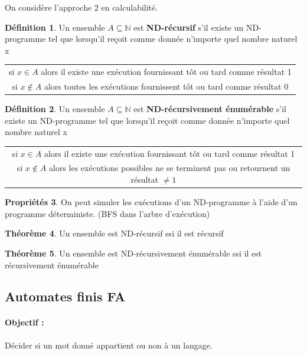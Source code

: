 \documentclass[11pt,a4paper]{article}
\newcommand{\N}{\mathbb{N}}
\theoremstyle{definition}
\newtheorem{mydef}{Définition}
\newtheorem{myprop}[mydef]{Propriétés}
\newtheorem{mytheo}[mydef]{Théorème}
\begin{document}
On considère l'approche 2 en calculabilité.

\begin{mydef}
	Un ensemble $A \subseteq \N$ est \textbf{ND-récursif} s’il existe un 
	ND-programme tel que lorsqu'il reçoit comme donnée n'importe quel nombre 
	naturel x \\
	\begin{tabular}{c}
	si $x \in A$ alors il existe une exécution fournissant tôt ou tard 
	comme résultat 1 \\
	si $x \notin A$ alors toutes les exécutions fournissent tôt ou tard 
	comme résultat 0 \\
	\end{tabular}
\end{mydef}

\begin{mydef}
	Un ensemble $A \subseteq \N$ est \textbf{ND-récursivement énumérable} s’il existe un 
	ND-programme tel que lorsqu'il reçoit comme donnée n'importe quel nombre 
	naturel x
	\begin{tabular}{c}
	si $x \in A$ alors il existe une exécution fournissant tôt ou tard 
	comme résultat 1 \\
	si $x \notin A$ alors les exécutions possibles ne se terminent pas ou 
	retournent un résultat $\neq 1$ \\
	\end{tabular}
\end{mydef}

\begin{myprop}
	On peut simuler les exécutions d'un ND-programme à l'aide d'un programme 
	déterministe. (BFS dans l'arbre d'exécution)
\end{myprop}

\begin{mytheo}
	Un ensemble est ND-récursif ssi il est récursif
\end{mytheo}

\begin{mytheo}
	Un ensemble est ND-récursivement énumérable ssi il est récursivement 
	énumérable
\end{mytheo}

\subsection{Automates finis FA}
\label{sub:automates_finis}

\paragraph{Objectif :} Décider si un mot donné appartient ou non à un langage.
\end{document}
